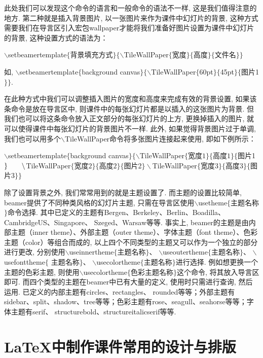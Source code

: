 此处我们可以发现这个命令的语言和一般命令的语法不一样, 这是我们值得注意的地方.
第二种就是插入背景图片, 以一张图片来作为课件中幻灯片的背景, 这种方式需要我们在导言区引入宏包wallpaper才能将我们准备好图片设置为课件中幻灯片的背景, 这种设置方式的语法为：\\
\centerline{
$\backslash$setbeamertemplate$\{$背景填充方式$\}\{\backslash$TileWallPaper$\{$宽度$\}\{$高度$\}\{$文件名$\}\}$}
如, $\backslash$setbeamertemplate$\{$background canvas$\}\{\backslash$TileWallPaper$\{$60pt$\}\{$45pt$\}\{$图片1$\}\}$.


在此种方式中我们可以调整插入图片的宽度和高度来完成有效的背景设置, 如果该条命令是放在导言区中, 则课件中的每张幻灯片都是以插入的这张图片为背景. 但我们也可以将这条命令放入正文部分的每张幻灯片的上方, 更换掉插入的图片, 就可以使得课件中每张幻灯片的背景图片不一样. 此外, 如果觉得背景图片过于单调, 我们也可以用多个$\backslash$TileWallPaper命令将多张图片连接起来使用, 即如下例所示：

\noindent $\backslash$setbeamertemplate$\{$background canvas$\}\{\backslash$TileWallPaper$\{$宽度$1\}\{$高度$1\}\{$图片1$\}\\ \qquad \backslash$TileWallPaper$\{$宽度$2\}\{$高度$2\}\{$图片2$\} \backslash$TileWallPaper$\{$宽度$3\}\{$高度$3\}\{$图片3$\}\}$


除了设置背景之外, 我们常常用到的就是主题设置了. 而主题的设置比较简单, beamer提供了不同种类风格的幻灯片主题, 只需在导言区使用$\backslash$usetheme$\{$主题名称$\}$命令选择. 其中已定义的主题有Bergen、Berkeley、Berlin、Boadilla、CambridgeUS、Singapore、
Szeged、Warsaw等等. 事实上, beamer的主题是由内部主题（inner theme）、外部主题（outer theme）、字体主题（font theme）、色彩主题（color）等组合而成的, 以上四个不同类型的主题又可以作为一个独立的部分进行更改, 分别使用$\backslash$useinnertheme$\{$主题名称$\}$、 $\backslash$useoutertheme$\{$主题名称$\}$、 $\backslash$usefonttheme$\{$ 主题名称$\}$、 $\backslash$usecolortheme$\{$主题名称$\}$进行选择. 例如想更换一个主题的色彩主题, 则使用$\backslash$usecolortheme$\{$色彩主题名称$\}$这个命令, 将其放入导言区即可. 而四个类型的主题在beamer中已有大量的定义, 使用时只需进行查询, 然后运用. 已定义的内部主题有circles、rectangles、
rounded等等；外部主题有sidebar、split、shadow、tree等等；色彩主题有rose、seagull、seahorse等等；字体主题有serif、
structurebold、structureitalicserif等等.


\section{\LaTeX{}中制作课件常用的设计与排版}

